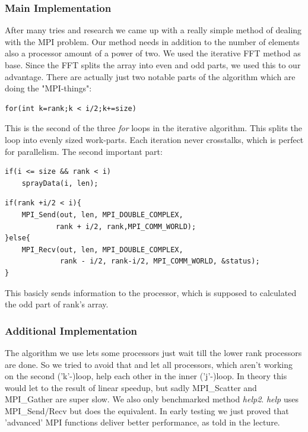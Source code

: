 	\subsubsection{Main Implementation}
After many tries and research we came up with a really simple method of dealing with the MPI problem. Our method needs in addition to the number of elements also a processor amount of a power of two. We used the iterative FFT method as base. Since the FFT splits the array into even and odd parts, we used this to our advantage. There are actually just two notable parts of the algorithm which are doing the "MPI-things":
\begin{lstlisting}
for(int k=rank;k < i/2;k+=size)
\end{lstlisting}
This is the second of the three \textit{for} loops in the iterative algorithm. This splits the loop into evenly sized work-parts. Each iteration never crosstalks, which is perfect for parallelism.\newline
The second important part:
\begin{lstlisting}
if(i <= size && rank < i)
	sprayData(i, len);
\end{lstlisting}
\begin{lstlisting}
if(rank +i/2 < i){
	MPI_Send(out, len, MPI_DOUBLE_COMPLEX,
			rank + i/2, rank,MPI_COMM_WORLD);
}else{
	MPI_Recv(out, len, MPI_DOUBLE_COMPLEX,
			 rank - i/2, rank-i/2, MPI_COMM_WORLD, &status);
}
\end{lstlisting}
This basicly sends information to the processor, which is supposed to calculated the odd part of rank's array. 

\subsubsection{Additional Implementation}
The algorithm we use lets some processors just wait till the lower rank processors are done. So we tried to avoid that and let all processors, which aren't working on the second ('k'-)loop, help each other in the inner ('j'-)loop. In theory this would let to the result of linear speedup, but sadly MPI\_Scatter and MPI\_Gather are super slow. We also only benchmarked method \textit{help2}. \textit{help} uses MPI\_Send/Recv but does the equivalent. In early testing we just proved that 'advanced' MPI functions deliver better performance, as told in the lecture.

